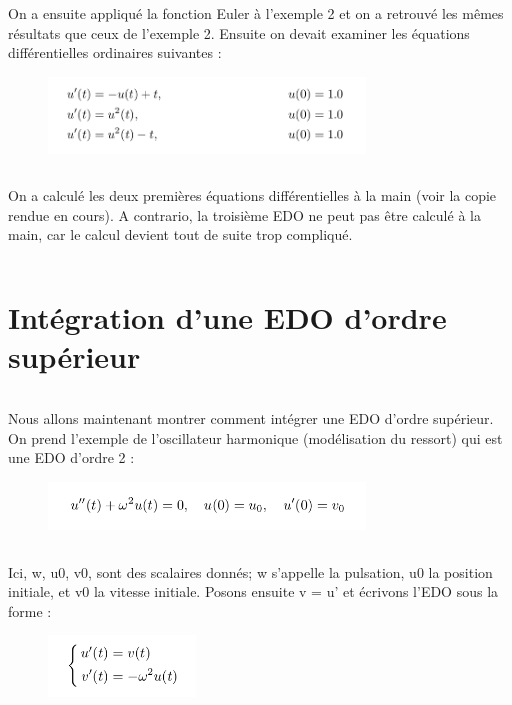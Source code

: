 \documentclass{article}
\begin{document}
$$ $$
$$ $$

On a ensuite appliqué la fonction Euler à l'exemple 2 et on a retrouvé les mêmes résultats que ceux de l'exemple 2.
\newline
Ensuite on devait examiner les équations différentielles ordinaires suivantes :
\newline
\newline
\begin{figure}
        \centering
        \includegraphics[width=0.75\textwidth]{edo.png}
\end{figure}

$$ $$
$$ $$
$$ $$
$$ $$

On a calculé les deux premières équations différentielles à la main (voir la copie rendue en cours). A contrario, la troisième EDO ne peut pas être calculé à la main, car le calcul devient tout de suite trop compliqué.

$$ $$

\section{Intégration d'une EDO d'ordre supérieur}
 
$$ $$

Nous allons maintenant montrer comment intégrer une EDO d'ordre supérieur. On prend l'exemple de l'oscillateur harmonique (modélisation du ressort) qui est une EDO d'ordre 2 : 
\newline
\begin{figure}
        \centering
        \includegraphics[width=0.75\textwidth]{e2.png}
\end{figure}

$$ $$

Ici, w, u0, v0, sont des scalaires donnés; w s'appelle la pulsation, u0 la position initiale, et v0 la vitesse initiale. Posons ensuite v = u' et écrivons l'EDO sous la forme :
\newline
\begin{figure}
        \centering
        \includegraphics[width=0.35\textwidth]{e3.png}
\end{figure}
\end{document}
